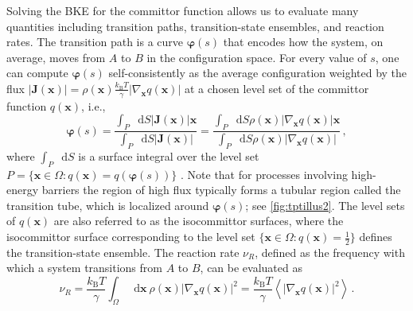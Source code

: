 \documentclass{article}
\numberwithin{equation}{section}
\def\*#1{\mathbf{#1}}
\newcommand*\diff{\mathop{}\!\mathrm{d}}
\theoremstyle{definition}
\theoremstyle{remark}
\def\varphib{\boldsymbol{\varphi}}
\begin{document}
Solving the BKE for the committor function allows us to evaluate many quantities including transition paths, transition-state ensembles, and reaction rates. 
The transition path is a curve $\varphib(s)$ that encodes how the system, on average, moves from $A$ to $B$ in the configuration space. 
For every value of $s$, one can compute $\varphib(s)$ self-consistently as the average configuration weighted by the flux $|\*  J(\* x)| = \rho(\* x)\frac{k_\mathrm{B} T}{\gamma}|\nabla_{\* x} q(\* x)|$ at a chosen level set of the committor function $q(\* x)$, i.e.,
\begin{equation}
    \varphib(s) = \frac{\int_{P} \diff S |\* J(\* x)| \* x}{\int_{P} \diff S |\* J(\* x)| } = \frac{\int_{P} \diff S \rho(\* x) |\nabla_{\* x}q(\* x)|  \* x}{\int_{P} \diff S \rho(\* x) |\nabla_{\* x}q(\* x)| } \,, \label{eq:pathdef} 
\end{equation}
where $\int_{P} \diff S $ is a surface integral over the level set $P= \{ \* x \in \Omega : q(\* x)=q(\varphib(s)) \}$ \cite{weinan2006towards, vanden2010transition}. 
Note that for processes involving high-energy barriers the region of high flux typically forms a tubular region called the transition tube, which is localized around $\varphib(s)$; see \cref{fig:tptillus2}. 
The level sets of $q(\* x)$ are also referred to as the isocommittor surfaces, where the isocommittor surface corresponding to the level set $\{ \* x \in \Omega : q(\* x)=\frac{1}{2} \}$ defines the transition-state ensemble. The reaction rate $\nu_R$, defined as the frequency with which a system transitions from $A$ to $B$, can be evaluated as \cite{weinan2006towards}
\begin{equation}
    \nu_R = \frac{k_\mathrm{B} T}{\gamma}\int_\Omega \diff \* x \ \rho(\* x) |\nabla_{\* x} q(\* x)|^2  = \frac{k_\mathrm{B} T}{\gamma} \left\langle |\nabla_{\* x} q(\* x)|^2  \right\rangle \label{eq:rxnrate} \,.
\end{equation}
\end{document}
